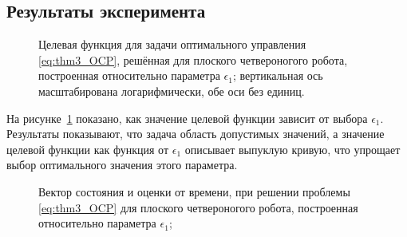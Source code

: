 \subsection{Результаты эксперимента}\label{sec:ch3/sect3/sub3}
\begin{figure}[ht]
	\caption{Целевая функция для задачи оптимального управления \eqref{eq:thm3_OCP}, решённая для плоского четвероногого робота, построенная относительно параметра $\epsilon_1$; вертикальная ось масштабирована логарифмически, обе оси без единиц.}\label{fig:mult_unit_cost}
\end{figure} 

На рисунке~\ref{fig:mult_unit_cost} показано, как значение целевой функции зависит от выбора $\epsilon_1$. Результаты показывают, что задача область допустимых значений, а значение целевой функции как функция от $\epsilon_1$ описывает выпуклую кривую, что упрощает выбор оптимального значения этого параметра.

\begin{figure}[ht]
	\caption{Вектор состояния и оценки от времени, при решении проблемы \eqref{eq:thm3_OCP} для плоского четвероногого робота, построенная относительно параметра $\epsilon_1$;}\label{fig:mult_unit_state}
\end{figure} 
